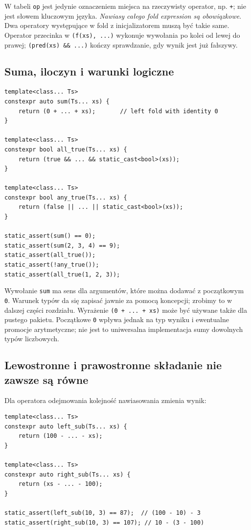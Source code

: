 W tabeli \texttt{op} jest jedynie oznaczeniem miejsca na rzeczywisty
operator, np. \texttt{+}; nie jest słowem kluczowym języka.
\emph{Nawiasy całego fold expression są obowiązkowe}.
Dwa operatory występujące w fold z inicjalizatorem muszą być takie same.
Operator przecinka w \texttt{(f(xs), ...)} wykonuje wywołania po kolei
od lewej do prawej; \texttt{(pred(xs) \&\& ...)} kończy sprawdzanie,
gdy wynik jest już fałszywy.

\subsection{Suma, iloczyn i warunki logiczne}

\begin{lstlisting}
template<class... Ts>
constexpr auto sum(Ts... xs) {
    return (0 + ... + xs);       // left fold with identity 0
}

template<class... Ts>
constexpr bool all_true(Ts... xs) {
    return (true && ... && static_cast<bool>(xs));
}

template<class... Ts>
constexpr bool any_true(Ts... xs) {
    return (false || ... || static_cast<bool>(xs));
}

static_assert(sum() == 0);
static_assert(sum(2, 3, 4) == 9);
static_assert(all_true());
static_assert(!any_true());
static_assert(all_true(1, 2, 3));
\end{lstlisting}

Wywołanie \texttt{sum} ma sens dla argumentów, które można dodawać
z początkowym \texttt{0}. Warunek typów da się zapisać jawnie za
pomocą koncepcji; zrobimy to w dalszej części rozdziału.
Wyrażenie \texttt{(0 + ... + xs)} może być używane także dla
pustego pakietu. Początkowe \texttt{0} wpływa jednak na typ wyniku
i ewentualne promocje arytmetyczne; nie jest to uniwersalna
implementacja sumy dowolnych typów liczbowych.

\subsection{Lewostronne i prawostronne składanie nie zawsze są równe}

Dla operatora odejmowania kolejność nawiasowania zmienia wynik:

\begin{lstlisting}
template<class... Ts>
constexpr auto left_sub(Ts... xs) {
    return (100 - ... - xs);
}

template<class... Ts>
constexpr auto right_sub(Ts... xs) {
    return (xs - ... - 100);
}

static_assert(left_sub(10, 3) == 87);  // (100 - 10) - 3
static_assert(right_sub(10, 3) == 107); // 10 - (3 - 100)
\end{lstlisting}

